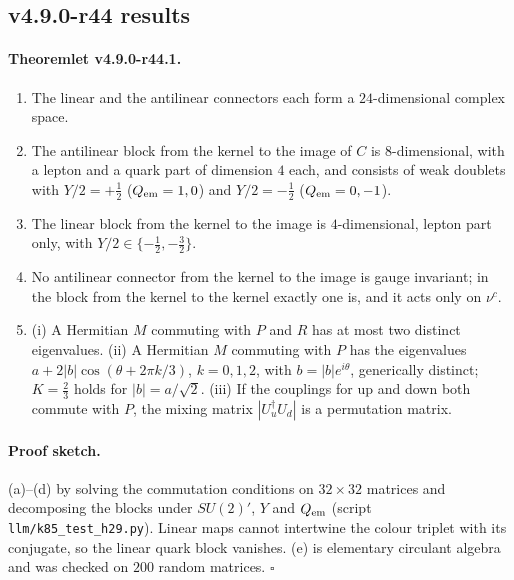 \subsection*{v4.9.0-r44 results}
\label{subsec:v490-r44-results}

\paragraph{Theoremlet v4.9.0-r44.1.}
\begin{enumerate}[leftmargin=2em]
\item[(a)] The linear and the antilinear connectors each form a \(24\)-dimensional complex space.
\item[(b)] The antilinear block from the kernel to the image of \(C\) is \(8\)-dimensional, with a lepton and a quark part of dimension \(4\) each,
and consists of weak doublets with \(Y/2=+\tfrac12\) (\(Q_{\rm em}=1,0\)) and \(Y/2=-\tfrac12\) (\(Q_{\rm em}=0,-1\)).
\item[(c)] The linear block from the kernel to the image is \(4\)-dimensional, lepton part only, with \(Y/2\in\{-\tfrac12,-\tfrac32\}\).
\item[(d)] No antilinear connector from the kernel to the image is gauge invariant; in the block from the kernel to the kernel exactly one is,
and it acts only on \(\nu^c\).
\item[(e)] (i) A Hermitian \(M\) commuting with \(P\) and \(R\) has at most two distinct eigenvalues.  (ii) A Hermitian \(M\) commuting with \(P\)
has the eigenvalues \(a+2|b|\cos(\theta+2\pi k/3)\), \(k=0,1,2\), with \(b=|b|e^{i\theta}\), generically distinct; \(K=\tfrac23\) holds for
\(|b|=a/\sqrt2\).  (iii) If the couplings for up and down both commute with \(P\), the mixing matrix \(|U_u^\dagger U_d|\) is a permutation
matrix.
\end{enumerate}

\paragraph{Proof sketch.}
(a)--(d) by solving the commutation conditions on \(32\times32\) matrices and decomposing the blocks under \(SU(2)'\), \(Y\) and \(Q_{\rm em}\)
(script \texttt{llm/k85\_test\_h29.py}).  Linear maps cannot intertwine the colour triplet with its conjugate, so the linear quark block
vanishes.  (e) is elementary circulant algebra and was checked on \(200\) random matrices.  \(\square\)

